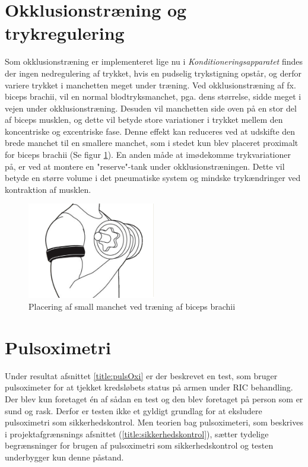 \section{Okklusionstræning og trykregulering}
Som okklusionstræning er implementeret lige nu i \textit{Konditioneringsapparatet} findes der ingen nedregulering af trykket, hvis en pudselig trykstigning opstår, og derfor variere trykket i manchetten meget under træning. Ved okklusionstræning af fx. biceps brachii, vil en normal blodtryksmanchet, pga. dens størrelse, sidde meget i vejen under okklusionstræning. Desuden vil manchetten side oven på en stor del af biceps musklen, og dette vil betyde store variationer i trykket mellem den koncentriske og excentriske fase. Denne effekt kan reduceres ved at udskifte den brede manchet til en smallere manchet, som i stedet kun blev placeret proximalt for biceps brachii (Se figur \ref{fig:okklcuff}). En anden måde at imødekomme trykvariationer på, er ved at montere en "reserve"-tank under okklusionstræningen. Dette vil betyde en større volume i det pneumatiske system og mindske trykændringer ved kontraktion af musklen. 
\begin{figure}[H]
	\centering
	\includegraphics[trim={1.5cm 0 1.5cm 0}, clip, width=0.5\textwidth]{billeder/okklusionCuff.png}
	\caption{Placering af small manchet ved træning af biceps brachii}\label{fig:okklcuff}
\end{figure}

\section{Pulsoximetri}
Under resultat afsnittet \ref{title:pulsOxi} er der beskrevet en test, som bruger pulsoximeter for at tjekket kredsløbets status på armen under RIC behandling. Der blev kun foretaget én af sådan en test og den blev foretaget på person som er sund og rask. Derfor er testen ikke et gyldigt grundlag for at eksludere pulsoximetri som sikkerhedskontrol. Men teorien bag pulsoximeteri, som beskrives i projektafgrænsnings afsnittet (\ref{title:sikkerhedskontrol}), sætter tydelige begrænsninger for brugen af pulsoximetri som sikkerhedskontrol og testen underbygger kun denne påstand. 



